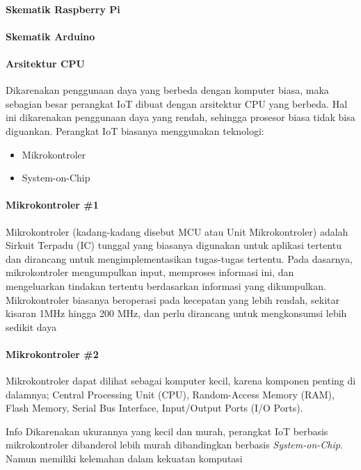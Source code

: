 \begin{frame}{\insertsectionhead}
	\framesubtitle{Skematik Raspberry Pi}
	\justifying
	\begin{figure}[ht!]
		\begin{subfigure}[b]{0.6\textwidth}
		\end{subfigure}
	\end{figure}
\end{frame}

\begin{frame}{\insertsectionhead}
	\framesubtitle{Skematik Arduino}
	\justifying
	\begin{figure}[ht!]
		\begin{subfigure}[b]{0.7\textwidth}
		\end{subfigure}
	\end{figure}
\end{frame}

\begin{frame}{\insertsectionhead}
	\framesubtitle{Arsitektur CPU}
	\justifying
	Dikarenakan penggunaan daya yang berbeda dengan komputer biasa, maka sebagian besar perangkat IoT dibuat dengan arsitektur CPU yang berbeda. Hal ini dikarenakan penggunaan daya yang rendah, sehingga prosesor biasa tidak bisa diguankan.
	\vfill
	Perangkat IoT biasanya menggunakan teknologi:
	\begin{itemize}
		\item Mikrokontroler
		\item System-on-Chip
	\end{itemize}
\end{frame}

\begin{frame}{\insertsectionhead}
	\framesubtitle{Mikrokontroler \#1}
	\justifying
	Mikrokontroler (kadang-kadang disebut MCU atau Unit Mikrokontroler) adalah Sirkuit Terpadu (IC) tunggal yang biasanya digunakan untuk aplikasi tertentu dan dirancang untuk mengimplementasikan tugas-tugas tertentu.
	\vfill
	Pada dasarnya, mikrokontroler mengumpulkan input, memproses informasi ini, dan mengeluarkan tindakan tertentu berdasarkan informasi yang dikumpulkan. Mikrokontroler biasanya beroperasi pada kecepatan yang lebih rendah, sekitar kisaran 1MHz hingga 200 MHz, dan perlu dirancang untuk mengkonsumsi lebih sedikit daya
\end{frame}

\begin{frame}{\insertsectionhead}
	\framesubtitle{Mikrokontroler \#2}
	\justifying
	Mikrokontroler dapat dilihat sebagai komputer kecil, karena komponen penting di dalamnya; Central Processing Unit (CPU), Random-Access Memory (RAM), Flash Memory, Serial Bus Interface, Input/Output Ports (I/O Ports).
	\vfill
	\begin{block}{Info}
		Dikarenakan ukurannya yang kecil dan murah, perangkat IoT berbasis mikrokontroler dibanderol lebih murah dibandingkan berbasis \textit{System-on-Chip}. Namun memiliki kelemahan dalam kekuatan komputasi
	\end{block}
\end{frame}

